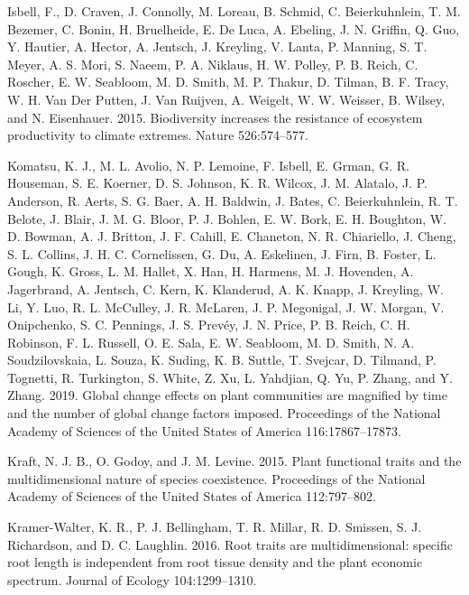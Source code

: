 \documentclass[twoside,12pt,final]{ucthesis-CA2012}
\begin{document}
\begin{ucmainmatter}
\leavevmode\hypertarget{ref-Isbell2015}{}%
Isbell, F., D. Craven, J. Connolly, M. Loreau, B. Schmid, C. Beierkuhnlein, T. M. Bezemer, C. Bonin, H. Bruelheide, E. De Luca, A. Ebeling, J. N. Griffin, Q. Guo, Y. Hautier, A. Hector, A. Jentsch, J. Kreyling, V. Lanta, P. Manning, S. T. Meyer, A. S. Mori, S. Naeem, P. A. Niklaus, H. W. Polley, P. B. Reich, C. Roscher, E. W. Seabloom, M. D. Smith, M. P. Thakur, D. Tilman, B. F. Tracy, W. H. Van Der Putten, J. Van Ruijven, A. Weigelt, W. W. Weisser, B. Wilsey, and N. Eisenhauer. 2015. Biodiversity increases the resistance of ecosystem productivity to climate extremes. Nature 526:574--577.

\leavevmode\hypertarget{ref-Komatsu2019}{}%
Komatsu, K. J., M. L. Avolio, N. P. Lemoine, F. Isbell, E. Grman, G. R. Houseman, S. E. Koerner, D. S. Johnson, K. R. Wilcox, J. M. Alatalo, J. P. Anderson, R. Aerts, S. G. Baer, A. H. Baldwin, J. Bates, C. Beierkuhnlein, R. T. Belote, J. Blair, J. M. G. Bloor, P. J. Bohlen, E. W. Bork, E. H. Boughton, W. D. Bowman, A. J. Britton, J. F. Cahill, E. Chaneton, N. R. Chiariello, J. Cheng, S. L. Collins, J. H. C. Cornelissen, G. Du, A. Eskelinen, J. Firn, B. Foster, L. Gough, K. Gross, L. M. Hallet, X. Han, H. Harmens, M. J. Hovenden, A. Jagerbrand, A. Jentsch, C. Kern, K. Klanderud, A. K. Knapp, J. Kreyling, W. Li, Y. Luo, R. L. McCulley, J. R. McLaren, J. P. Megonigal, J. W. Morgan, V. Onipchenko, S. C. Pennings, J. S. Prevéy, J. N. Price, P. B. Reich, C. H. Robinson, F. L. Russell, O. E. Sala, E. W. Seabloom, M. D. Smith, N. A. Soudzilovskaia, L. Souza, K. Suding, K. B. Suttle, T. Svejcar, D. Tilmand, P. Tognetti, R. Turkington, S. White, Z. Xu, L. Yahdjian, Q. Yu, P. Zhang, and Y. Zhang. 2019. Global change effects on plant communities are magnified by time and the number of global change factors imposed. Proceedings of the National Academy of Sciences of the United States of America 116:17867--17873.

\leavevmode\hypertarget{ref-Kraft2015}{}%
Kraft, N. J. B., O. Godoy, and J. M. Levine. 2015. Plant functional traits and the multidimensional nature of species coexistence. Proceedings of the National Academy of Sciences of the United States of America 112:797--802.

\leavevmode\hypertarget{ref-Kramer-Walter2016}{}%
Kramer-Walter, K. R., P. J. Bellingham, T. R. Millar, R. D. Smissen, S. J. Richardson, and D. C. Laughlin. 2016. Root traits are multidimensional: specific root length is independent from root tissue density and the plant economic spectrum. Journal of Ecology 104:1299--1310.


\end{ucmainmatter}
\end{document}
